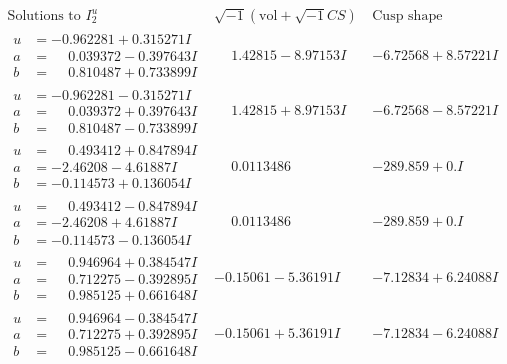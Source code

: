 \documentclass[1p]{elsarticle_modified}
\theoremstyle{definition}
\newcommand{\I}{\sqrt{-1}}
\begin{document}
$$\begin{array}{c|c|c}  
\text{Solutions to }I^u_{2}& \I (\text{vol} + \sqrt{-1}CS) & \text{Cusp shape}\\
 \hline 
\begin{aligned}
u &= -0.962281 + 0.315271 I \\
a &= \phantom{-}0.039372 - 0.397643 I \\
b &= \phantom{-}0.810487 + 0.733899 I\end{aligned}
 & \phantom{-}1.42815 - 8.97153 I & -6.72568 + 8.57221 I \\ \hline\begin{aligned}
u &= -0.962281 - 0.315271 I \\
a &= \phantom{-}0.039372 + 0.397643 I \\
b &= \phantom{-}0.810487 - 0.733899 I\end{aligned}
 & \phantom{-}1.42815 + 8.97153 I & -6.72568 - 8.57221 I \\ \hline\begin{aligned}
u &= \phantom{-}0.493412 + 0.847894 I \\
a &= -2.46208 - 4.61887 I \\
b &= -0.114573 + 0.136054 I\end{aligned}
 & \phantom{-}0.0113486\phantom{ +0.000000I} & -289.859 + 0. I\phantom{ +0.000000I} \\ \hline\begin{aligned}
u &= \phantom{-}0.493412 - 0.847894 I \\
a &= -2.46208 + 4.61887 I \\
b &= -0.114573 - 0.136054 I\end{aligned}
 & \phantom{-}0.0113486\phantom{ +0.000000I} & -289.859 + 0. I\phantom{ +0.000000I} \\ \hline\begin{aligned}
u &= \phantom{-}0.946964 + 0.384547 I \\
a &= \phantom{-}0.712275 - 0.392895 I \\
b &= \phantom{-}0.985125 + 0.661648 I\end{aligned}
 & -0.15061 - 5.36191 I & -7.12834 + 6.24088 I \\ \hline\begin{aligned}
u &= \phantom{-}0.946964 - 0.384547 I \\
a &= \phantom{-}0.712275 + 0.392895 I \\
b &= \phantom{-}0.985125 - 0.661648 I\end{aligned}
 & -0.15061 + 5.36191 I & -7.12834 - 6.24088 I \\ \hline\begin{aligned}

\end{aligned}
\end{array}$$
\end{document}
